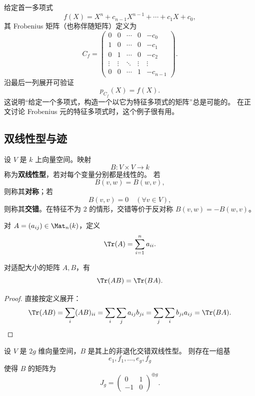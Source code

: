 \begin{example}[Frobenius（伴随）矩阵]
给定首一多项式
\[
  f(X)=X^n+c_{n-1}X^{n-1}+\cdots+c_1X+c_0,
\]
其 Frobenius 矩阵（也称伴随矩阵）定义为
\[
  C_f=
  \begin{pmatrix}
    0 & 0 & \cdots & 0 & -c_0 \\
    1 & 0 & \cdots & 0 & -c_1 \\
    0 & 1 & \cdots & 0 & -c_2 \\
    \vdots & \vdots & \ddots & \vdots & \vdots \\
    0 & 0 & \cdots & 1 & -c_{n-1}
  \end{pmatrix}.
\]
沿最后一列展开可验证
\[
  p_{C_f}(X)=f(X).
\]
这说明“给定一个多项式，构造一个以它为特征多项式的矩阵”总是可能的。
在正文讨论 Frobenius 元的特征多项式时，这个例子很有用。
\end{example}

\subsection{双线性型与迹}

\begin{definition}[双线性型]
设 $V$ 是 $k$ 上向量空间。映射
\[
  B\colon V\times V\to k
\]
称为\textbf{双线性型}，若对每个变量分别都是线性的。
若
\[
  B(v,w)=B(w,v),
\]
则称其\textbf{对称}；若
\[
  B(v,v)=0 \quad (\forall v\in V),
\]
则称其\textbf{交错}。在特征不为 $2$ 的情形，交错等价于反对称
$B(v,w)=-B(w,v)$。
\end{definition}

\begin{definition}[迹]
对 $A=(a_{ij})\in \Mat_n(k)$，定义
\begin{equation}
  \Tr(A)=\sum_{i=1}^n a_{ii}.
\end{equation}
\end{definition}

\begin{proposition}
对适配大小的矩阵 $A,B$，有
\begin{equation}
  \Tr(AB)=\Tr(BA).
\end{equation}
\end{proposition}

\begin{proof}
直接按定义展开：
\[
  \Tr(AB)=\sum_i (AB)_{ii}=\sum_i\sum_j a_{ij}b_{ji}
  =\sum_j\sum_i b_{ji}a_{ij}=\Tr(BA).
\]
\end{proof}

\begin{proposition}
设 $V$ 是 $2g$ 维向量空间，$B$ 是其上的非退化交错双线性型。
则存在一组基
\[
  e_1,f_1,\dots,e_g,f_g
\]
使得 $B$ 的矩阵为
\begin{equation}
  J_g =
  \begin{pmatrix}0&1\\-1&0\end{pmatrix}^{\oplus g}.
\end{equation}
\end{proposition}

